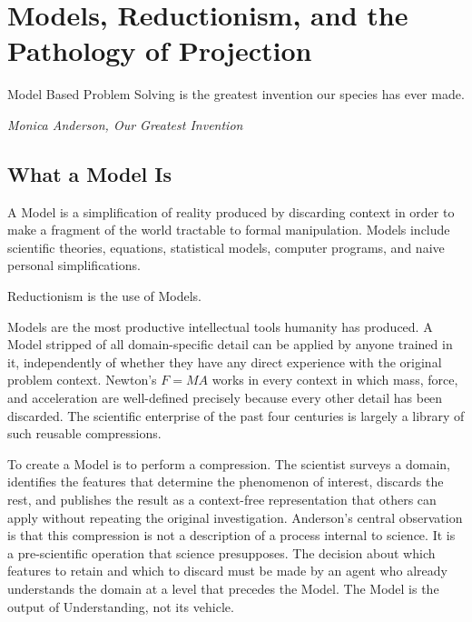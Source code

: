 \documentclass[12pt, a4paper, oneside]{book}
\begin{document}
\chapter{Models, Reductionism, and the Pathology of Projection}
\label{ch:models}

\epigraph{%
  Model Based Problem Solving is the greatest invention our species
  has ever made.%
}{\textit{Monica Anderson, \emph{Our Greatest Invention}}}

\section{What a Model Is}

\begin{definition}
A Model is a simplification of reality produced by discarding context
in order to make a fragment of the world tractable to formal
manipulation. Models include scientific theories, equations, statistical
models, computer programs, and naive personal simplifications.
\end{definition}

\begin{definition}
Reductionism is the use of Models.
\end{definition}

Models are the most productive intellectual tools humanity has produced.
A Model stripped of all domain-specific detail can be applied
by anyone trained in it, independently of whether they have any direct
experience with the original problem context.
Newton's $F = MA$ works in every context in which mass, force, and
acceleration are well-defined precisely because every other detail has been
discarded. The scientific enterprise of the past four centuries is largely
a library of such reusable compressions.

To create a Model is to perform a compression. The scientist surveys a
domain, identifies the features that determine the phenomenon of interest,
discards the rest, and publishes the result as a context-free representation
that others can apply without repeating the original investigation.
Anderson's central observation is that this compression is not a
description of a process internal to science.
It is a pre-scientific operation that science presupposes.
The decision about which features to retain and which to discard must
be made by an agent who already understands the domain at a level that
precedes the Model.
The Model is the output of Understanding, not its vehicle.
\end{document}
